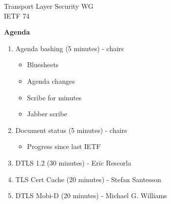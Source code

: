\documentclass[helvetica]{seminar}
\newcommand{\heading}[1]{%
  \begin{center} 
    \large\bf 
    #1 
  \end{center} 
  \vspace{.4 in}}
\begin{document}
\begin{slide}
\begin{center}
\vspace{1 in}
\LARGE{{\bf}Transport Layer Security WG}\\
\large{{IETF 74}} \\
\end{center}
\end{slide}


\centerslidesfalse 

\begin{slide}
\heading{Agenda}

{\tiny
\begin{enumerate}
\item Agenda bashing (5 minutes) - chairs
\begin{itemize}
\item Bluesheets
\item Agenda changes
\item Scribe for minutes
\item Jabber scribe
\end{itemize}
\item Document status (5 minutes) - chairs
\begin{itemize}
\item Progress since last IETF
\end{itemize}      
\item  DTLS 1.2 (30 minutes) - Eric Rescorla
\item  TLS Cert Cache (20 minutes) - Stefan Santesson
\item  DTLS Mobi-D (20 minutes) - Michael G. Williams
\end{enumerate}
}

\end{slide}
\end{document}
